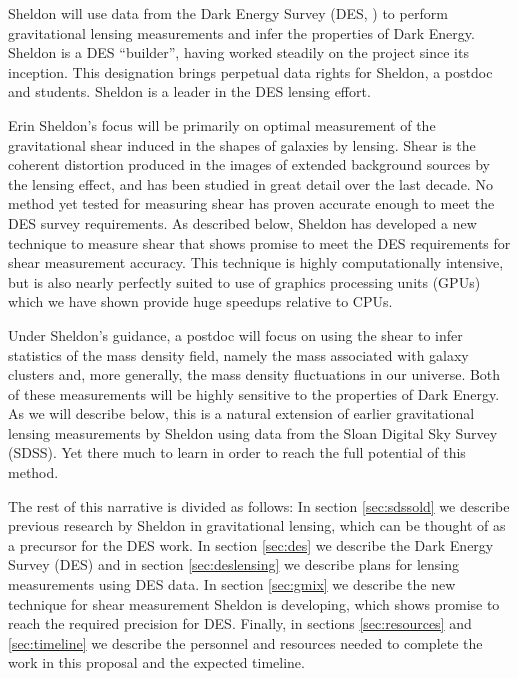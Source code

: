 \documentclass[12pt]{article}
\begin{document}
Sheldon will use data from the Dark Energy Survey (DES, \cite{DESWhitePaper})
to perform gravitational lensing measurements and infer the properties of Dark
Energy.  Sheldon is a DES ``builder'', having worked steadily on the project
since its inception.  This designation brings perpetual data rights for
Sheldon, a postdoc and students.  Sheldon is a leader in the DES lensing
effort.  

Erin Sheldon's focus will be primarily on optimal measurement of the
gravitational shear induced in the shapes of galaxies by lensing. Shear is the
coherent distortion produced in the images of extended background sources by
the lensing effect, and has been studied in great detail over the last decade.
No method yet tested for measuring shear has proven accurate enough to meet the
DES survey requirements.  As described below, Sheldon has developed a new
technique to measure shear that shows promise to meet the DES requirements for
shear measurement accuracy.  This technique is highly computationally
intensive, but is also nearly perfectly suited to use of graphics processing
units (GPUs) which we have shown provide huge speedups relative to CPUs.

Under Sheldon's guidance, a postdoc will focus on using the shear to infer
statistics of the mass density field, namely the mass associated with galaxy
clusters and, more generally, the mass density fluctuations in our universe.
Both of these measurements will be highly sensitive to the properties of Dark
Energy.   As we will describe below, this is a natural extension of earlier
gravitational lensing measurements by Sheldon using data from the Sloan Digital
Sky Survey (SDSS).  Yet there much to learn in order to reach the full
potential of this method.

The rest of this narrative is divided as follows: In section \ref{sec:sdssold}
we describe previous research by Sheldon in gravitational lensing, which can be
thought of as a precursor for the DES work.  In section \ref{sec:des} we
describe the Dark Energy Survey (DES) and in section \ref{sec:deslensing} we
describe plans for lensing measurements using DES data.  In section
\ref{sec:gmix} we describe the new technique for shear measurement Sheldon is
developing, which shows promise to reach the required precision for DES. 
Finally, in sections \ref{sec:resources} and \ref{sec:timeline} we describe the
personnel and resources needed to complete the work in this proposal and the
expected timeline.
\end{document}
